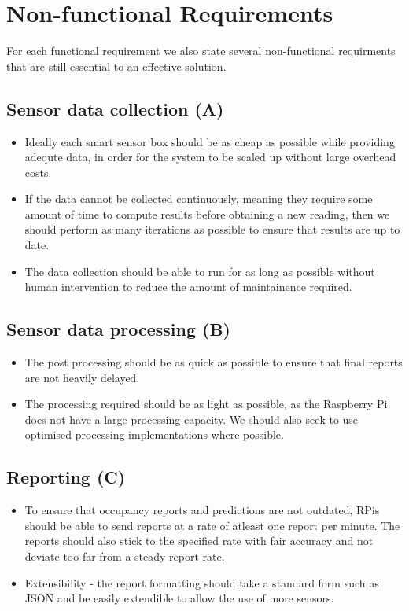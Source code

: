\documentclass{l4proj}
\begin{document}
\section{Non-functional Requirements}
For each functional requirement we also state several non-functional requirments that are still essential to an effective solution.

\subsection{Sensor data collection (A)}
\begin{itemize}
  \item Ideally each smart sensor box should be as cheap as possible while providing adequte data, in order for the system to be scaled up without large overhead costs.
  \item If the data cannot be collected continuously, meaning they require some amount of time to compute results before obtaining a new reading, then we should perform as many iterations as possible to ensure that results are up to date.
  \item The data collection should be able to run for as long as possible without human intervention to reduce the amount of maintainence required.
\end{itemize}


\subsection{Sensor data processing (B)}
\begin{itemize}
  \item The post processing should be as quick as possible to ensure that final reports are not heavily delayed.
  \item The processing required should be as light as possible, as the Raspberry Pi does not have a large processing capacity. We should also seek to use optimised processing implementations where possible.
\end{itemize}

\subsection{Reporting (C)}
\begin{itemize}	
  \item To ensure that occupancy reports and predictions are not outdated, RPis should be able to send reports at a rate of atleast one report per minute. The reports should also stick to the specified rate with fair accuracy and not deviate too far from a steady report rate.
  \item Extensibility - the report formatting should take a standard form such as JSON and be easily extendible to allow the use of more sensors.
\end{itemize}
\end{document}
